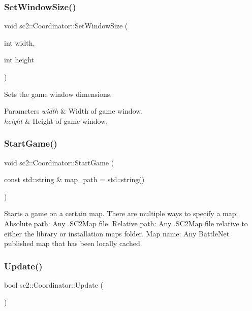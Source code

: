 \subsubsection{\texorpdfstring{Set\+Window\+Size()}{SetWindowSize()}}
{\footnotesize\ttfamily void sc2\+::\+Coordinator\+::\+Set\+Window\+Size (\begin{DoxyParamCaption}\item[{int}]{width,  }\item[{int}]{height }\end{DoxyParamCaption})}

Sets the game window dimensions. 
\begin{DoxyParams}{Parameters}
{\em width} & Width of game window. \\
\hline
{\em height} & Height of game window. \\
\hline
\end{DoxyParams}
\mbox{\label{classsc2_1_1_coordinator_a63fe152548d28b619a7bc577544fcdc8}} 
\subsubsection{\texorpdfstring{Start\+Game()}{StartGame()}}
{\footnotesize\ttfamily void sc2\+::\+Coordinator\+::\+Start\+Game (\begin{DoxyParamCaption}\item[{const std\+::string \&}]{map\+\_\+path = {\ttfamily std\+:\+:string()} }\end{DoxyParamCaption})}

Starts a game on a certain map. There are multiple ways to specify a map\+: Absolute path\+: Any .S\+C2\+Map file. Relative path\+: Any .S\+C2\+Map file relative to either the library or installation maps folder. Map name\+: Any Battle\+Net published map that has been locally cached. \mbox{\label{classsc2_1_1_coordinator_af70ba5246f9d447eb8a69cd76d364eee}} 
\subsubsection{\texorpdfstring{Update()}{Update()}}
{\footnotesize\ttfamily bool sc2\+::\+Coordinator\+::\+Update (\begin{DoxyParamCaption}{ }\end{DoxyParamCaption})}

